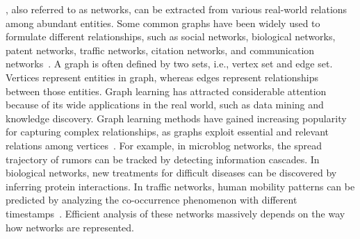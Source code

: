

\label{sec:introduction}
, also referred to as networks, can be extracted from various real-world relations among abundant entities. Some common graphs have been widely used to formulate different relationships, such as social networks, biological networks, patent networks, traffic networks, citation networks, and communication networks~. A graph is often defined by two sets, i.e., vertex set and edge set. Vertices represent entities in  graph, whereas edges represent relationships between those entities. Graph learning has attracted considerable attention because of its wide applications in the real world, such as data mining and knowledge discovery. Graph learning methods have gained  increasing popularity for capturing complex relationships, as graphs exploit essential and relevant relations among vertices~. For example, in microblog networks, the spread trajectory of rumors can be tracked by detecting information cascades. In biological networks, new treatments for difficult diseases can be discovered by inferring protein interactions. In traffic networks, human mobility patterns can be predicted by analyzing the co-occurrence phenomenon with different timestamps~. Efficient analysis of these networks massively depends on the way how networks are represented.


